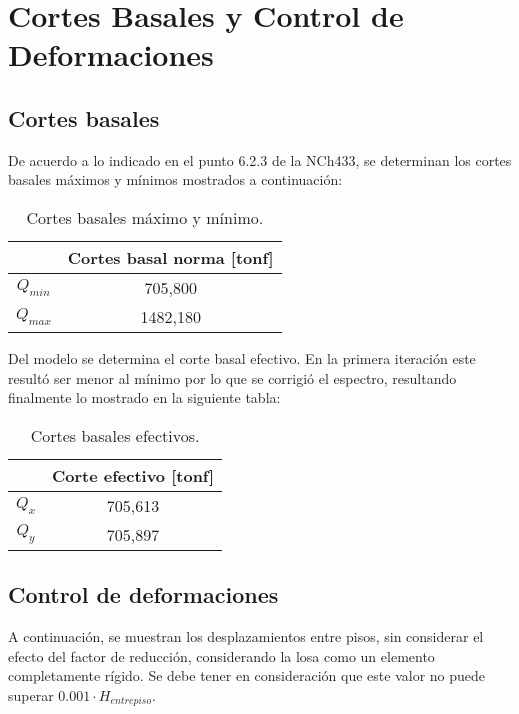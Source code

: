 \newpage
\section{Cortes Basales y Control de Deformaciones}

    \subsection{Cortes basales}
    
        De acuerdo a lo indicado en el punto 6.2.3 de la NCh433, se determinan los cortes basales máximos y mínimos mostrados a continuación:
        
        \begin{table}[H]
            \centering
            \caption{Cortes basales máximo y mínimo.}
                \begin{tabular}{cc}
                    \hline
                          & \textbf{Cortes basal norma [tonf]} \bigstrut\\
                    \hline
                    $Q_{min}$ & 705,800 \bigstrut[t]\\
                    $Q_{max}$ & 1482,180 \bigstrut[b]\\
                    \hline
                \end{tabular}%
            \label{cortex_max_min}%
        \end{table}%
        
        Del modelo se determina el corte basal efectivo. En la primera iteración este resultó ser menor al mínimo por lo que se corrigió el espectro, resultando finalmente lo mostrado en la siguiente tabla:
        
        \begin{table}[htbp]
          \centering
          \caption{Cortes basales efectivos.}
            \begin{tabular}{cc}
            \toprule
                  & \textbf{Corte efectivo [tonf]} \\
            \midrule
            $Q_x$ & 705,613 \\
            $Q_y$ & 705,897 \\
            \bottomrule
            \end{tabular}%
          \label{cortes}%
        \end{table}%

    \newpage
    \subsection{Control de deformaciones}
    A continuación, se muestran los desplazamientos entre pisos, sin considerar el efecto del factor de reducción, considerando la losa como un elemento completamente rígido. Se debe tener en consideración que este valor no puede superar $0.001 \cdot H_{entrepiso}$.
    
